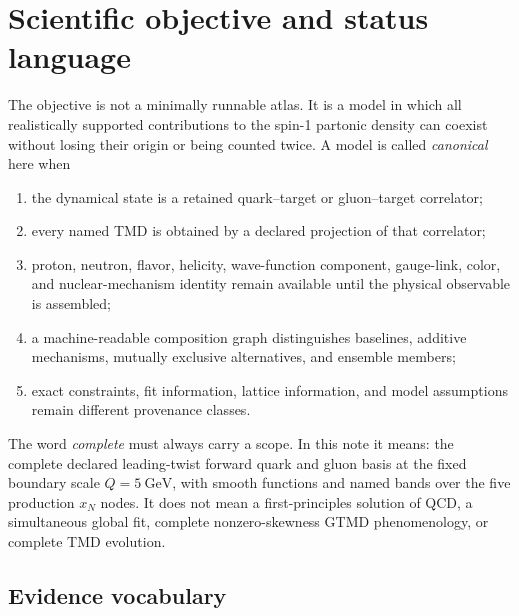 \documentclass[11pt]{article}
\begin{document}
\tableofcontents
\clearpage

\section{Scientific objective and status language}
\label{sec:objective}

The objective is not a minimally runnable atlas.  It is a model in which
all realistically supported contributions to the spin-1 partonic density
can coexist without losing their origin or being counted twice.  A model
is called \emph{canonical} here when
\begin{enumerate}
  \item the dynamical state is a retained quark--target or gluon--target
  correlator;
  \item every named TMD is obtained by a declared projection of that
  correlator;
  \item proton, neutron, flavor, helicity, wave-function component,
  gauge-link, color, and nuclear-mechanism identity remain available until
  the physical observable is assembled;
  \item a machine-readable composition graph distinguishes baselines,
  additive mechanisms, mutually exclusive alternatives, and ensemble
  members;
  \item exact constraints, fit information, lattice information, and model
  assumptions remain different provenance classes.
\end{enumerate}

The word \emph{complete} must always carry a scope.  In this note it means:
the complete declared leading-twist forward quark and gluon basis at the
fixed boundary scale \(Q=5~\mathrm{GeV}\), with smooth functions and named
bands over the five production \(x_N\) nodes.  It does not mean a
first-principles solution of QCD, a simultaneous global fit, complete
nonzero-skewness GTMD phenomenology, or complete TMD evolution.

\subsection{Evidence vocabulary}
\end{document}
